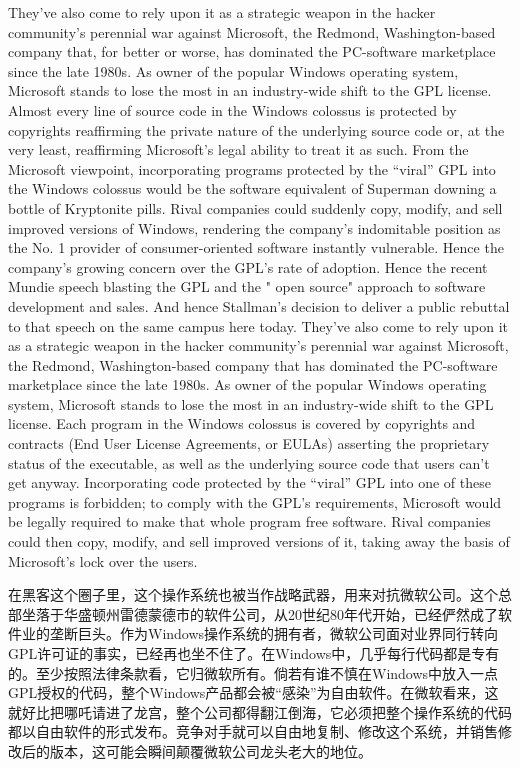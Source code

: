 \ifdefined\eng
\ifdefined\vone
They've also come to rely upon it as a strategic weapon in the hacker community's perennial war against Microsoft, the Redmond, Washington-based company that, for better or worse, has dominated the PC-software marketplace since the late 1980s. As owner of the popular Windows operating system, Microsoft stands to lose the most in an industry-wide shift to the GPL license. Almost every line of source code in the Windows colossus is protected by copyrights reaffirming the private nature of the underlying source code or, at the very least, reaffirming Microsoft's legal ability to treat it as such. From the Microsoft viewpoint, incorporating programs protected by the ``viral'' GPL into the Windows colossus would be the software equivalent of Superman downing a bottle of Kryptonite pills. Rival companies could suddenly copy, modify, and sell improved versions of Windows, rendering the company's indomitable position as the No. 1 provider of consumer-oriented software instantly vulnerable. Hence the company's growing concern over the GPL's rate of adoption. Hence the recent Mundie speech blasting the GPL and the " open source" approach to software development and sales. And hence Stallman's decision to deliver a public rebuttal to that speech on the same campus here today.
\fi
\ifdefined\vtwo
They've also come to rely upon it as a strategic weapon in the hacker community's perennial war against Microsoft, the Redmond, Washington-based company that has dominated the PC-software marketplace since the late 1980s. As owner of the popular Windows operating system, Microsoft stands to lose the most in an industry-wide shift to the GPL license. Each program in the Windows colossus is covered by copyrights and contracts (End User License Agreements, or EULAs) asserting the proprietary status of the executable, as well as the underlying source code that users can't get anyway. Incorporating code protected by the ``viral'' GPL into one of these programs is forbidden; to comply with the GPL's requirements, Microsoft would be legally required to make that whole program free software. Rival companies could then copy, modify, and sell improved versions of it, taking away the basis of Microsoft's lock over the users.
\fi
\fi

\ifdefined\chs
在黑客这个圈子里，这个操作系统也被当作战略武器，用来对抗微软公司。这个总部坐落于华盛顿州雷德蒙德市的软件公司，从20世纪80年代开始，已经俨然成了软件业的垄断巨头。作为Windows操作系统的拥有者，微软公司面对业界同行转向GPL许可证的事实，已经再也坐不住了。在Windows中，几乎每行代码都是专有的。至少按照法律条款看，它归微软所有。倘若有谁不慎在Windows中放入一点GPL授权的代码，整个Windows产品都会被``感染''为自由软件。在微软看来，这就好比把哪吒请进了龙宫，整个公司都得翻江倒海，它必须把整个操作系统的代码都以自由软件的形式发布。竞争对手就可以自由地复制、修改这个系统，并销售修改后的版本，这可能会瞬间颠覆微软公司龙头老大的地位。
\fi

